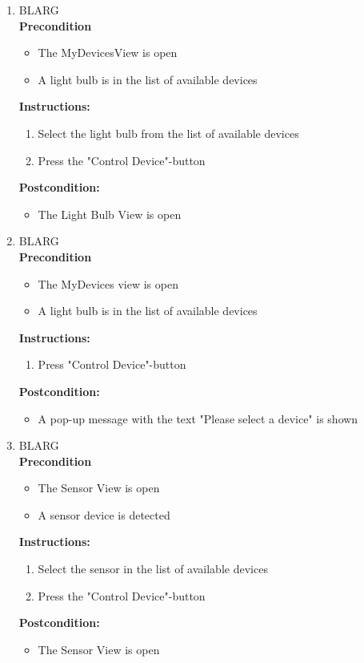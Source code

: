 \documentclass[a4paper]{article}
\newlength{\testlabellength}
\newenvironment{testlist}{\begin{enumerate}[label=\bfseries Instruction \thesubsection.\arabic* , labelindent=0pt, labelwidth=\testlabellength , leftmargin=2cm]}{\end{enumerate}}
\newenvironment{precondition}{
{\color{white}BLARG}\\ 
\textbf{Precondition}
\begin{itemize}[labelindent=0cm, labelwidth=2cm , leftmargin=1cm]
}
{\end{itemize}}
\newenvironment{instruction}{
\textbf{Instructions:}
\begin{enumerate}[label=\bfseries  \arabic*., labelindent=0cm, labelwidth=2cm , leftmargin=1cm]
}
{\end{enumerate}}
\newenvironment{postcondition}{
\textbf{Postcondition:}
\begin{itemize}[labelindent=0cm, labelwidth=2cm , leftmargin=1cm]
}
{\end{itemize}}
\begin{document}
\begin{appendices}
\begin{testlist}
	\item
		\begin{precondition}
			\item The MyDevicesView is open
			\item A light bulb is in the list of available devices
		\end{precondition}
		\begin{instruction}
			\item Select the light bulb from the list of available devices
			\item Press the "Control Device"-button
		\end{instruction}
		\begin{postcondition}
			\item The Light Bulb View is open
		\end{postcondition}

	\item
		\begin{precondition}
			\item The MyDevices view is open
			\item A light bulb is in the list of available devices
		\end{precondition}
		\begin{instruction}
			\item Press "Control Device"-button
		\end{instruction}
		\begin{postcondition}
			\item A pop-up message with the text "Please select a device" is shown
		\end{postcondition}	

	\item
		\begin{precondition}
			\item The Sensor View is open
			\item A sensor device is detected
		\end{precondition}
		\begin{instruction}
			\item Select the sensor in the list of available devices
			\item Press the "Control Device"-button
		\end{instruction}
		\begin{postcondition}
			\item The Sensor View is open
		\end{postcondition}


\end{testlist}
\end{appendices}
\end{document}
